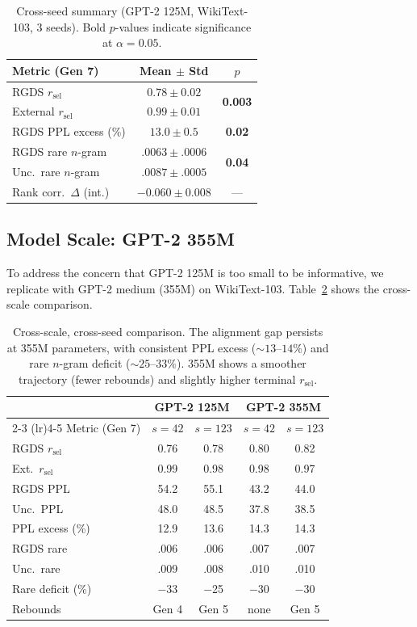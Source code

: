\documentclass[11pt,a4paper]{article}
\newcommand{\ratio}{\ensuremath{r_{\text{sel}}}}
\begin{document}
\begin{table}[t]
\centering
\small
\begin{tabular}{lcc}
\toprule
Metric (Gen 7) & Mean $\pm$ Std & $p$ \\
\midrule
RGDS $\ratio$ & $0.78 \pm 0.02$ & \multirow{2}{*}{\textbf{0.003}} \\
External $\ratio$ & $0.99 \pm 0.01$ & \\
\midrule
RGDS PPL excess (\%) & $13.0 \pm 0.5$ & \textbf{0.02} \\
\midrule
RGDS rare $n$-gram & $.0063 \pm .0006$ & \multirow{2}{*}{\textbf{0.04}} \\
Unc.\ rare $n$-gram & $.0087 \pm .0005$ & \\
\midrule
Rank corr.\ $\Delta$ (int.) & $-0.060 \pm 0.008$ & --- \\
\bottomrule
\end{tabular}
\caption{Cross-seed summary (GPT-2 125M, WikiText-103, 3 seeds). Bold $p$-values indicate significance at $\alpha{=}0.05$.}
\label{tab:crossseed}
\end{table}

\subsection{Model Scale: GPT-2 355M}
\label{sec:scale}

To address the concern that GPT-2 125M is too small to be informative, we replicate with GPT-2 medium (355M) on WikiText-103.
Table~\ref{tab:scale} shows the cross-scale comparison.

\begin{table}[t]
\centering
\small
\begin{tabular}{lcccc}
\toprule
& \multicolumn{2}{c}{GPT-2 125M} & \multicolumn{2}{c}{GPT-2 355M} \\
\cmidrule(lr){2-3} \cmidrule(lr){4-5}
Metric (Gen 7) & $s{=}42$ & $s{=}123$ & $s{=}42$ & $s{=}123$ \\
\midrule
RGDS $\ratio$ & 0.76 & 0.78 & 0.80 & 0.82 \\
Ext.\ $\ratio$ & 0.99 & 0.98 & 0.98 & 0.97 \\
RGDS PPL & 54.2 & 55.1 & 43.2 & 44.0 \\
Unc.\ PPL & 48.0 & 48.5 & 37.8 & 38.5 \\
PPL excess (\%) & 12.9 & 13.6 & 14.3 & 14.3 \\
RGDS rare & .006 & .006 & .007 & .007 \\
Unc.\ rare & .009 & .008 & .010 & .010 \\
Rare deficit (\%) & $-$33 & $-$25 & $-$30 & $-$30 \\
Rebounds & Gen 4 & Gen 5 & none & Gen 5 \\
\bottomrule
\end{tabular}
\caption{Cross-scale, cross-seed comparison. The alignment gap persists at 355M parameters, with consistent PPL excess (${\sim}13$--$14\%$) and rare $n$-gram deficit (${\sim}25$--$33\%$). 355M shows a smoother trajectory (fewer rebounds) and slightly higher terminal $\ratio$.}
\label{tab:scale}
\end{table}
\end{document}
